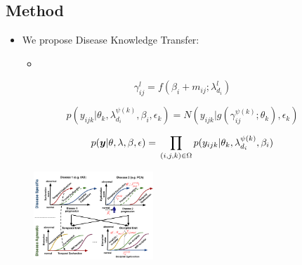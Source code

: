 \documentclass[portrait,a0,final,19pt]{a0poster}
\begin{document}
\begin{multicols}{2}
\section*{Method}



\begin{itemize}
 \item We propose Disease Knowledge Transfer:
 \begin{itemize}
   \item 
 \end{itemize}

\end{itemize}



\newcommand{\lp}{\lambda_{d_i}^{\psi(k)}}
\newcommand{\lpuu}{\lambda_{d_i}^{\psi(k),(u)}}
\newcommand{\lpum}{\lambda_{d_i}^{\psi(k),(u-1)}}

\begin{equation}
\label{eqDysfunctionScoreDef}
 \gamma_{ij}^l = f(\beta_{i} + m_{ij}; \lambda_{d_i}^l)
\end{equation}


\begin{equation}
 p(y_{ijk}|\theta_k, \lp, \beta_{i}, \epsilon_k) = N(y_{ijk}| g( \gamma_{ij}^{\psi(k)} ; \theta_k), \epsilon_k)
\end{equation}


\begin{equation}
\label{eq:dktFinal}
 p(\boldsymbol{y}|\theta, \lambda, \beta , \epsilon) = \\ \prod_{(i,j,k) \in \Omega} p(y_{ijk}|\theta_k, \lp, \beta_{i}) 
\end{equation}


\begin{figure}[H]
 \centering
 \includegraphics[width=0.4\textwidth,]{../figures/disease_knowledge_transfer_symbols.pdf}
 \caption{}
 \label{fig:diagram}
\end{figure}




\end{multicols}
\end{document}
